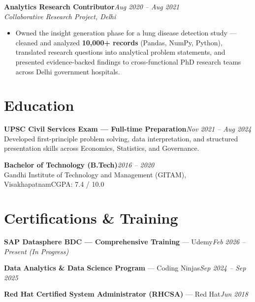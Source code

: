 \documentclass[10pt, letterpaper]{article}
\newcommand{\role}[3]{%
  \vspace{2pt}%
  {\bfseries #1}\hfill{\small\color{muted}\textit{#3}}\\[-2pt]%
  {\small\color{muted}\textit{#2}}%
}
\begin{document}
\role{Analytics Research Contributor}{Collaborative Research Project, Delhi}{Aug 2020 – Aug 2021}

\begin{itemize}
  \item Owned the insight generation phase for a lung disease detection study — cleaned and analyzed \textbf{10,000+ records} (Pandas, NumPy, Python), translated research questions into analytical problem statements, and presented evidence-backed findings to cross-functional PhD research teams across Delhi government hospitals.
\end{itemize}


\section{Education}

{\bfseries UPSC Civil Services Exam — Full-time Preparation}\hfill{\small\color{muted}\textit{Nov 2021 – Aug 2024}}\\
{\small\color{muted}Developed first-principle problem solving, data interpretation, and structured presentation skills across Economics, Statistics, and Governance.}

\vspace{2pt}
{\bfseries Bachelor of Technology (B.Tech)}\hfill{\small\color{muted}\textit{2016 – 2020}}\\
{\small\color{muted}Gandhi Institute of Technology and Management (GITAM), Visakhapatnam\hfill CGPA: 7.4 / 10.0}

\section{Certifications \& Training}

{\bfseries SAP Datasphere BDC — Comprehensive Training} — Udemy\hfill{\small\color{muted}\textit{Feb 2026 – Present \emph{(In Progress)}}}

\vspace{1pt}
{\bfseries Data Analytics \& Data Science Program} — Coding Ninjas\hfill{\small\color{muted}\textit{Sep 2024 – Sep 2025}}

\vspace{1pt}
{\bfseries Red Hat Certified System Administrator (RHCSA)} — Red Hat\hfill{\small\color{muted}\textit{Jun 2018}}

\end{document}
